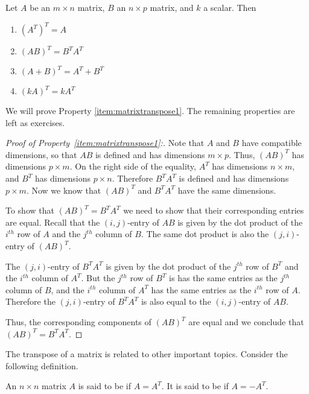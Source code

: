 \documentclass{ximera}
\begin{document}
\begin{theorem}\label{th:transposeproperties}
Let $A$ be an $m\times n$ matrix, $B$ an $n\times p$ matrix, and $k$ a scalar. Then
\begin{enumerate}
\item\label{item:transoftrans}
$\left(A^{T}\right)^{T} = A$
\item\label{item:matrixtranspose1}
$\left( AB\right) ^{T}=B^{T}A^{T} $ 
\item\label{item:matrixtranspose2}
$\left( A+ B\right) ^{T}=A^{T}+ B^{T}$  
\item\label{item:matrixtranspose3}
$\left(kA\right)^T=kA^T$
\end{enumerate}
\end{theorem}
We will prove Property \ref{item:matrixtranspose1}.  The remaining properties are left as exercises.
\begin{proof}[Proof of Property~\ref{item:matrixtranspose1}:]
Note that $A$ and $B$ have compatible dimensions, so that $AB$ is defined and has dimensions $m\times p$.  Thus, $(AB)^T$ has dimensions $p\times m$.  On the right side of the equality, $A^T$ has dimensions $n\times m$, and $B^T$ has dimensions $p\times n$.  Therefore $B^TA^T$ is defined and has dimensions $p\times m$.  Now we know that $(AB)^T$ and $B^TA^T$ have the same dimensions.

To show that $(AB)^T=B^TA^T$ we need to show that their corresponding entries are equal. 
Recall that the $(i,j)$-entry of $AB$ is given by
the dot product of the $i^{th}$ row of $A$ and the $j^{th}$ column of $B$.  
The same dot product is also the $(j,i)$-entry of $(AB)^T$.  

The $(j,i)$-entry of $B^TA^T$ is given by the dot product of the $j^{th}$ row of $B^T$ and the $i^{th}$ column of $A^T$.  But the $j^{th}$ row of $B^T$ is has the same entries as the $j^{th}$ column of $B$, and   the $i^{th}$ column of $A^T$ has the same entries as the $i^{th}$ row of $A$.  Therefore the $(j,i)$-entry of $B^TA^T$ is also equal to the $(i,j)$-entry of $AB$.

Thus, the corresponding components of $(AB)^T$ are equal and we conclude that $(AB)^T=B^TA^T$.
\end{proof}

The transpose of a matrix is related to other important topics. Consider the following definition.  

\begin{definition}\label{def:symmetricandskewsymmetric}
An $n\times n$ matrix $A$ is said to be
 if $A=A^{T}.$ It is said to be
 if $A=-A^{T}.$
\end{definition}
\end{document}
